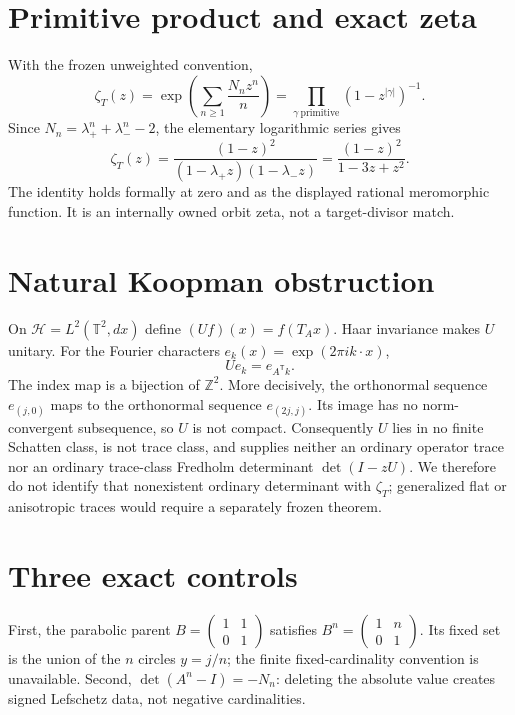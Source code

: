 \documentclass[10pt]{article}
\begin{document}
\section{Primitive product and exact zeta}
With the frozen unweighted convention,
\[
 \zeta_T(z)=\exp\!\left(\sum_{n\geq1}\frac{N_nz^n}{n}\right)
 =\prod_{\gamma\ \mathrm{primitive}}(1-z^{|\gamma|})^{-1}.
\]
Since $N_n=\lambda_+^n+\lambda_-^n-2$, the elementary logarithmic series
gives
\[
 \boxed{\displaystyle
 \zeta_T(z)=\frac{(1-z)^2}
 {(1-\lambda_+z)(1-\lambda_-z)}
 =\frac{(1-z)^2}{1-3z+z^2}.}
\]
The identity holds formally at zero and as the displayed rational meromorphic
function.  It is an internally owned orbit zeta, not a target-divisor match.

\section{Natural Koopman obstruction}
On $\mathcal H=L^2(\mathbb T^2,dx)$ define $(Uf)(x)=f(T_Ax)$.  Haar
invariance makes $U$ unitary.  For the Fourier characters
$e_k(x)=\exp(2\pi i k\cdot x)$,
\[
 Ue_k=e_{A^{\mathsf T}k}.
\]
The index map is a bijection of $\mathbb Z^2$.  More decisively, the
orthonormal sequence $e_{(j,0)}$ maps to the orthonormal sequence
$e_{(2j,j)}$.  Its image has no norm-convergent subsequence, so $U$ is not
compact.  Consequently $U$ lies in no finite Schatten class, is not trace
class, and supplies neither an ordinary operator trace nor an ordinary
trace-class Fredholm determinant $\det(I-zU)$.  We therefore do not identify
that nonexistent ordinary determinant with $\zeta_T$; generalized flat or
anisotropic traces would require a separately frozen theorem.

\section{Three exact controls}
First, the parabolic parent
$B=\left(\begin{smallmatrix}1&1\\0&1\end{smallmatrix}\right)$ satisfies
$B^n=\left(\begin{smallmatrix}1&n\\0&1\end{smallmatrix}\right)$.
Its fixed set is the union of the $n$ circles $y=j/n$; the finite
fixed-cardinality convention is unavailable.  Second,
$\det(A^n-I)=-N_n$: deleting the absolute value creates signed Lefschetz
data, not negative cardinalities.
\end{document}
